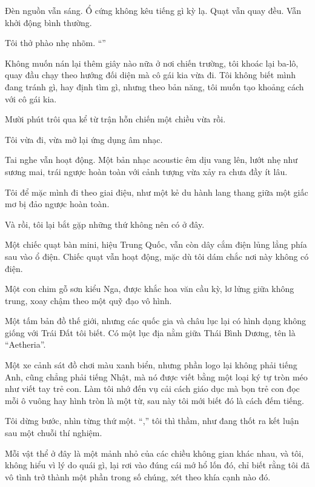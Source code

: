 \documentclass[../main.tex]{subfiles}
\begin{document}
Đèn nguồn vẫn sáng. Ổ cứng không kêu tiếng gì kỳ lạ. Quạt vẫn quay đều. Vẫn khởi động bình thường.

Tôi thở phào nhẹ nhõm. ``''

Không muốn nán lại thêm giây nào nữa ở nơi chiến trường, tôi khoác lại ba-lô, quay đầu chạy theo hướng đối diện mà cô gái kia vừa đi. Tôi không biết mình đang tránh gì, hay định tìm gì, nhưng theo bản năng, tôi muốn tạo khoảng cách với cô gái kia.

\ct

Mười phút trôi qua kể từ trận hỗn chiến một chiều vừa rồi.

Tôi vừa đi, vừa mở lại ứng dụng âm nhạc.

Tai nghe vẫn hoạt động. Một bản nhạc acoustic êm dịu vang lên, lướt nhẹ như sương mai, trái ngược hoàn toàn với cảnh tượng vừa xảy ra chưa đầy ít lâu.

Tôi để mặc mình đi theo giai điệu, như một kẻ du hành lang thang giữa một giấc mơ bị đảo ngược hoàn toàn.

Và rồi, tôi lại bắt gặp những thứ không nên có ở đây.

Một chiếc quạt bàn mini, hiệu Trung Quốc, vẫn còn dây cắm điện lủng lẳng phía sau vào ổ điện. Chiếc quạt vẫn hoạt động, mặc dù tôi dám chắc nơi này không có điện.

Một con chim gỗ sơn kiểu Nga, được khắc hoa văn cầu kỳ, lơ lửng giữa không trung, xoay chậm theo một quỹ đạo vô hình.

Một tấm bản đồ thế giới, nhưng các quốc gia và châu lục lại có hình dạng không giống với Trái Đất tôi biết. Có một lục địa nằm giữa Thái Bình Dương, tên là ``Aetheria''.

Một xe cảnh sát đồ chơi màu xanh biển, nhưng phần logo lại không phải tiếng Anh, cũng chẳng phải tiếng Nhật, mà nó được viết bằng một loại ký tự tròn méo như viết tay trẻ con. Làm tôi nhớ đến vụ cải cách giáo dục mà bọn trẻ con đọc mỗi ô vuông hay hình tròn là một từ, sau này tôi mới biết đó là cách đếm tiếng.

Tôi dừng bước, nhìn từng thứ một. ``,'' tôi thì thầm, như đang thốt ra kết luận sau một chuỗi thí nghiệm.

Mỗi vật thể ở đây là một mảnh nhỏ của các chiều không gian khác nhau, và tôi, không hiểu vì lý do quái gì, lại rơi vào đúng cái mớ hổ lốn đó, chỉ biết rằng tôi đã vô tình trở thành một phần trong số chúng, xét theo khía cạnh nào đó.
\end{document}
